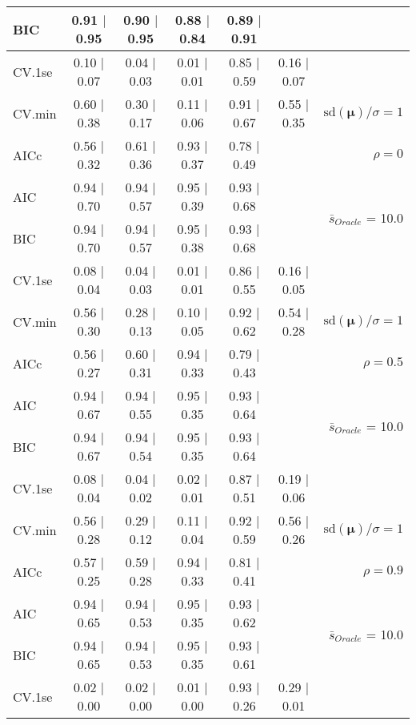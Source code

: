\begin{table}
\begin{center}
\begin{tabular}{l*{5}{c}|r}
BIC & 0.91 $\mid$ 0.95 & 0.90 $\mid$ 0.95 & 0.88 $\mid$ 0.84 & 0.89 $\mid$ 0.91 & &  \\
 \hline 
CV.1se & 0.10 $\mid$ 0.07 & 0.04 $\mid$ 0.03 & 0.01 $\mid$ 0.01 & 0.85 $\mid$ 0.59 & 0.16 $\mid$ 0.07 & \\
CV.min & 0.60 $\mid$ 0.38 & 0.30 $\mid$ 0.17 & 0.11 $\mid$ 0.06 & 0.91 $\mid$ 0.67 & 0.55 $\mid$ 0.35 &  $\mathrm{sd}(\mathbf{\mu})/\sigma=1$ \\
AICc & 0.56 $\mid$ 0.32 & 0.61 $\mid$ 0.36 & 0.93 $\mid$ 0.37 & 0.78 $\mid$ 0.49 & & $\rho=0$ \\
AIC & 0.94 $\mid$ 0.70 & 0.94 $\mid$ 0.57 & 0.95 $\mid$ 0.39 & 0.93 $\mid$ 0.68 & &  \multirow{2}{*}{$\bar{s}_{Oracle}$ = 10.0} \\
BIC & 0.94 $\mid$ 0.70 & 0.94 $\mid$ 0.57 & 0.95 $\mid$ 0.38 & 0.93 $\mid$ 0.68 & &  \\
 \hline 
CV.1se & 0.08 $\mid$ 0.04 & 0.04 $\mid$ 0.03 & 0.01 $\mid$ 0.01 & 0.86 $\mid$ 0.55 & 0.16 $\mid$ 0.05 & \\
CV.min & 0.56 $\mid$ 0.30 & 0.28 $\mid$ 0.13 & 0.10 $\mid$ 0.05 & 0.92 $\mid$ 0.62 & 0.54 $\mid$ 0.28 &  $\mathrm{sd}(\mathbf{\mu})/\sigma=1$ \\
AICc & 0.56 $\mid$ 0.27 & 0.60 $\mid$ 0.31 & 0.94 $\mid$ 0.33 & 0.79 $\mid$ 0.43 & & $\rho=0.5$ \\
AIC & 0.94 $\mid$ 0.67 & 0.94 $\mid$ 0.55 & 0.95 $\mid$ 0.35 & 0.93 $\mid$ 0.64 & &  \multirow{2}{*}{$\bar{s}_{Oracle}$ = 10.0} \\
BIC & 0.94 $\mid$ 0.67 & 0.94 $\mid$ 0.54 & 0.95 $\mid$ 0.35 & 0.93 $\mid$ 0.64 & &  \\
 \hline 
CV.1se & 0.08 $\mid$ 0.04 & 0.04 $\mid$ 0.02 & 0.02 $\mid$ 0.01 & 0.87 $\mid$ 0.51 & 0.19 $\mid$ 0.06 & \\
CV.min & 0.56 $\mid$ 0.28 & 0.29 $\mid$ 0.12 & 0.11 $\mid$ 0.04 & 0.92 $\mid$ 0.59 & 0.56 $\mid$ 0.26 &  $\mathrm{sd}(\mathbf{\mu})/\sigma=1$ \\
AICc & 0.57 $\mid$ 0.25 & 0.59 $\mid$ 0.28 & 0.94 $\mid$ 0.33 & 0.81 $\mid$ 0.41 & & $\rho=0.9$ \\
AIC & 0.94 $\mid$ 0.65 & 0.94 $\mid$ 0.53 & 0.95 $\mid$ 0.35 & 0.93 $\mid$ 0.62 & &  \multirow{2}{*}{$\bar{s}_{Oracle}$ = 10.0} \\
BIC & 0.94 $\mid$ 0.65 & 0.94 $\mid$ 0.53 & 0.95 $\mid$ 0.35 & 0.93 $\mid$ 0.61 & &  \\
 \hline 
CV.1se & 0.02 $\mid$ 0.00 & 0.02 $\mid$ 0.00 & 0.01 $\mid$ 0.00 & 0.93 $\mid$ 0.26 & 0.29 $\mid$ 0.01 & \\

\end{tabular}
\end{center}
\end{table}
